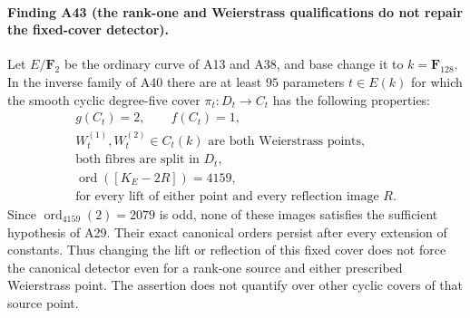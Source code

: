 \documentclass[11pt,a4paper]{article}
\begin{document}
\paragraph{Finding A43 (the rank-one and Weierstrass qualifications do not repair the fixed-cover detector).}
Let $E/\mathbf F_2$ be the ordinary curve of A13 and A38, and
base change it to $k=\mathbf F_{128}$. In the inverse family
of A40 there are at least $95$ parameters $t\in E(k)$ for
which the smooth cyclic degree-five cover
$\pi_t:D_t\to C_t$ has the following properties:
\[
 \begin{gathered}
       g(C_t)=2,\qquad f(C_t)=1,\\
 W_t^{(1)},W_t^{(2)}\in C_t(k)\text{ are both Weierstrass points,}\\
 \text{both fibres are split in }D_t,\\
 \operatorname{ord}([K_E-2R])=4159,\\
 \text{for every lift of either point and every reflection image }R.
 \end{gathered}
 \tag{RWI.1}
\]
Since $\operatorname{ord}_{4159}(2)=2079$ is odd, none of
these images satisfies the sufficient hypothesis of A29.
Their exact canonical orders persist after every extension
of constants. Thus changing the lift or reflection of this
fixed cover does not force the canonical detector even for
a rank-one source and either prescribed Weierstrass point.
The assertion does not quantify over other cyclic covers
of that source point.
\end{document}
